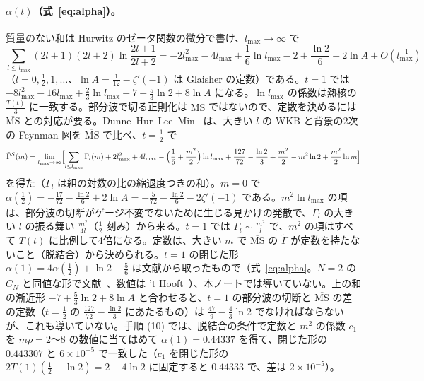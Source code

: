 \documentclass[a4paper,10pt]{ltjsarticle}
\newcommand{\MSbar}{\overline{\mathrm{MS}}}
\begin{document}
\paragraph{$\alpha(t)$（式~\eqref{eq:alpha}）。}質量のない和は Hurwitz のゼータ関数の微分で書け、$l_{\max}\to\infty$ で
\begin{equation*}
\sum_{l\le l_{\max}}(2l+1)(2l+2)\ln\frac{2l+1}{2l+2}=-2l_{\max}^2-4l_{\max}+\frac16\ln l_{\max}-2+\frac{\ln2}6+2\ln A+O(l_{\max}^{-1})
\end{equation*}
（$l=0,\frac12,1,\dots$、$\ln A=\frac1{12}-\zeta'(-1)$ は Glaisher の定数）である。$t=1$ では $-8l_{\max}^2-16l_{\max}+\frac23\ln l_{\max}-7+\frac53\ln2+8\ln A$ になる。$\ln l_{\max}$ の係数は熱核の $\frac{T(t)}3$ に一致する。部分波で切る正則化は $\MSbar$ ではないので、定数を決めるには $\MSbar$ との対応が要る。Dunne--Hur--Lee--Min~\cite{dhlm05,dhlm05b} は、大きい $l$ の WKB と背景の2次の Feynman 図を $\MSbar$ で比べ、$t=\frac12$ で
\begin{equation*}
\tilde\Gamma^S(m)=\lim_{l_{\max}\to\infty}\Bigl[\sum_{l\le l_{\max}}\Gamma_l(m)+2l_{\max}^2+4l_{\max}-\Bigl(\frac16+\frac{m^2}2\Bigr)\ln l_{\max}+\frac{127}{72}-\frac{\ln2}3+\frac{m^2}2-m^2\ln2+\frac{m^2}2\ln m\Bigr]
\end{equation*}
を得た（$\Gamma_l$ は組の対数の比の縮退度つきの和）。$m=0$ で $\alpha(\frac12)=-\frac{17}{72}-\frac{\ln2}6+2\ln A=-\frac5{72}-\frac{\ln2}6-2\zeta'(-1)$ である。$m^2\ln l_{\max}$ の項は、部分波の切断がゲージ不変でないために生じる見かけの発散で、$\Gamma_l$ の大きい $l$ の振る舞い $\frac{m^2}{4l}$（$\frac12$ 刻み）から来る。$t=1$ では $\Gamma_l\sim\frac{m^2}l$ で、$m^2$ の項はすべて $T(t)$ に比例して4倍になる。定数は、大きい $m$ で $\MSbar$ の $\tilde\Gamma$ が定数を持たないこと（脱結合）から決められる。$t=1$ の閉じた形 $\alpha(1)=4\alpha(\frac12)+\ln2-\frac56$ は文献から取ったもので（式~\eqref{eq:alpha}。$N=2$ の $C_N$ と同値な形で文献~\cite{fm25}、数値は 't Hooft~\cite{thooft76}）、本ノートでは導いていない。上の和の漸近形 $-7+\frac53\ln2+8\ln A$ と合わせると、$t=1$ の部分波の切断と $\MSbar$ の差の定数（$t=\frac12$ の $\frac{127}{72}-\frac{\ln2}3$ にあたるもの）は $\frac{47}9-\frac43\ln2$ でなければならないが、これも導いていない。手順 (10) では、脱結合の条件で定数と $m^2$ の係数 $c_1$ を $m\rho=2$〜8 の数値に当てはめて $\alpha(1)=0.44337$ を得て、閉じた形の $0.443307$ と $6\times10^{-5}$ で一致した（$c_1$ を閉じた形の $2T(1)(\frac12-\ln2)=2-4\ln2$ に固定すると $0.44333$ で、差は $2\times10^{-5}$）。
\end{document}
